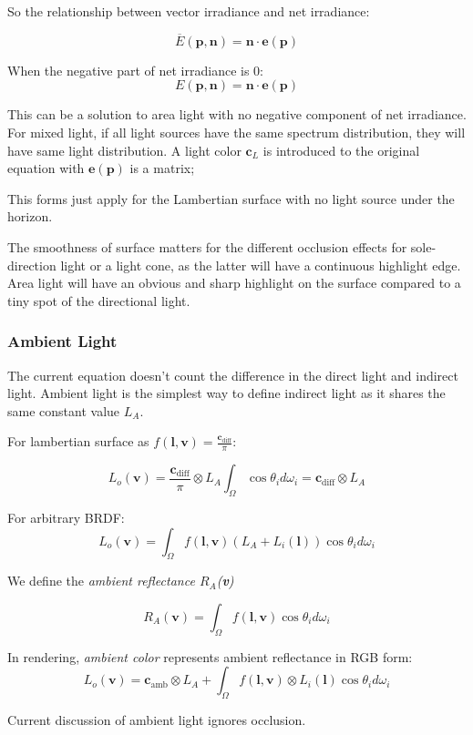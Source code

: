 \documentclass[10pt, a4paper]{article}
\begin{document}
        So the relationship between vector irradiance and net irradiance: 

        $$\overline{E}(\textbf{p}, \textbf{n}) = \textbf{n} \cdot \textbf{e}(\textbf{p})$$

        When the negative part of net irradiance is 0:
        $$E(\textbf{p}, \textbf{n}) = \textbf{n} \cdot \textbf{e}(\textbf{p})$$
        
        This can be a solution to area light with no negative component of net irradiance. For mixed light, if all light sources have the same spectrum distribution, they will have same light distribution. A light color $\textbf{c}_L$ is introduced to the original equation with $\textbf{e}(\textbf{p})$ is a matrix; 

        This forms just apply for the Lambertian surface with no light source under the horizon. 

        The smoothness of surface matters for the different occlusion effects for sole-direction light or a light cone, as the latter will have a continuous highlight edge. Area light will have an obvious and sharp highlight on the surface compared to a tiny spot of the directional light.
    
    \subsubsection{Ambient Light}
        The current equation doesn't count the difference in the direct light and indirect light. Ambient light is the simplest way to define indirect light as it shares the same constant value $L_A$.

        For lambertian surface as $f(\textbf{l}, \textbf{v}) = \frac{\textbf{c}_{\text{diff}}}{\pi}$: 

        $$L_o(\textbf{v}) = \frac{\textbf{c}_{\text{diff}}}{\pi} \otimes L_A\int_{\Omega}\cos{\theta_i}d\omega_i  = \textbf{c}_{\text{diff}} \otimes L_A$$
           
        For arbitrary BRDF: 
        $$
            L_o(\textbf{v}) = \int_{\Omega}f(\textbf{l}, \textbf{v})(L_A + L_i(\textbf{l}))\cos{\theta_i}d\omega_i
        $$

        We define the \emph{ambient reflectance $R_A$(\textbf{v})}

        $$R_A(\textbf{v}) = \int_{\Omega}f(\textbf{l}, \textbf{v})\cos{\theta_i}d\omega_i$$

        In rendering, \emph{ambient color} represents ambient reflectance in RGB form: 
        $$
        L_o(\textbf{v}) = \textbf{c}_{\text{amb}} \otimes L_A  + \int_{\Omega}f(\textbf{l}, \textbf{v}) \otimes L_i(\textbf{l})\cos{\theta_i}d\omega_i
    $$

        Current discussion of ambient light ignores occlusion. 
    
    \subsubsection{}

        



        

    




        
\end{document}
